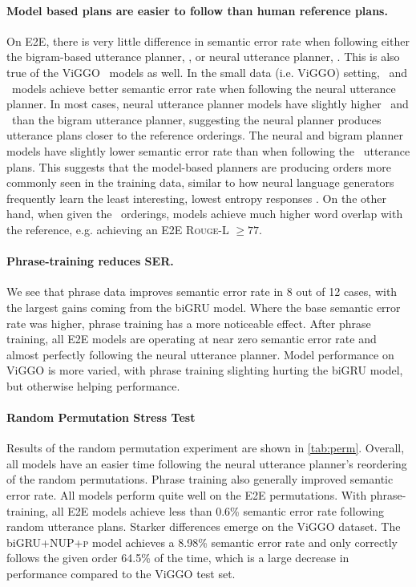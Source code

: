 \paragraph{Model based plans are easier to follow than human reference plans.
} On E2E, there is very little difference in semantic error rate when following
either the bigram-based utterance planner, \BgUP, or neural utterance planner,
\NUP. This is also true of the ViGGO \BART~models as well.  In the small data
(i.e. ViGGO) setting, \biGRU~and \Transformer~models achieve better semantic
error rate when following the neural utterance planner.  In most cases, neural
utterance planner models have slightly higher \bleu~and \rougel~than the bigram
utterance planner, suggesting the neural planner produces utterance plans
closer to the reference orderings. The neural and bigram planner models have
slightly lower semantic error rate than when following the \Oracle~utterance
plans.  This suggests that the model-based planners are producing orders more
commonly seen in the training data, similar to how neural language generators
frequently learn the least interesting, lowest entropy responses
\citep{serban2016}.  On the other hand, when given the \Oracle~orderings,
models achieve much higher word overlap with the reference, e.g. achieving an
E2E \textsc{Rouge-L} $\ge 77$.



\paragraph{Phrase-training reduces SER.} We see that phrase data improves
semantic error rate in 8 out of 12 cases, with the largest gains coming from
the biGRU  model.  Where the base semantic error rate was higher,
phrase training has a more noticeable effect. After phrase training, all E2E
models are operating at near zero semantic error rate and almost perfectly
following the neural utterance planner. Model performance on ViGGO is more
varied, with phrase training slighting hurting the biGRU 
model, but otherwise helping performance.

\paragraph{Random Permutation Stress Test} Results of the random permutation
experiment are shown in \autoref{tab:perm}.  Overall, all models have an easier
time following the neural utterance planner's reordering of the random
permutations. Phrase training also generally improved semantic error rate.  All
models perform quite well on the E2E permutations.  With phrase-training, all
E2E models achieve less than 0.6\% semantic error rate following random
utterance plans.  Starker differences emerge on the ViGGO dataset.  The
biGRU\textsc{+NUP+p} model achieves a 8.98\% semantic error rate and only
correctly follows the given order 64.5\% of the time, which is a large decrease
in performance compared to the ViGGO test set.

